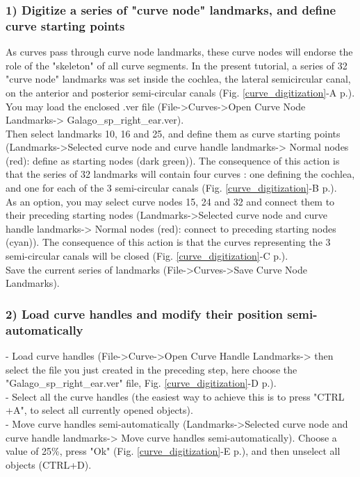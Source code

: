 \documentclass[12pt, a4paper]{book}
\begin{document}
\subsubsection{1) Digitize a series of "curve node" landmarks, and define curve starting points}
As curves pass through curve node landmarks, these curve nodes will endorse the role of the "skeleton" of all curve segments. In the present tutorial, a series of 32 "curve node" landmarks was set inside the cochlea, the lateral semicircular canal, on the anterior and posterior semi-circular canals (Fig. \ref{curve_digitization}-A p.\pageref{curve_digitization}). You may load the enclosed .ver file (File->Curves->Open Curve Node Landmarks-> Galago\_sp\_right\_ear.ver).\\

Then select landmarks 10, 16 and 25, and define them as curve starting points (Landmarks->Selected curve node and curve handle landmarks-> Normal nodes (red): define as starting nodes (dark green)). The consequence of this action is that the series of 32 landmarks will contain four
curves : one defining the cochlea, and one for each of the 3 semi-circular canals (Fig. \ref{curve_digitization}-B p.\pageref{curve_digitization}).\\

As an option, you may select curve nodes 15, 24 and 32 and connect them to their preceding starting
nodes (Landmarks->Selected curve node and curve handle landmarks-> Normal nodes (red): connect
to preceding starting nodes (cyan)). The consequence of this action is that the curves representing
the 3 semi-circular canals will be closed (Fig. \ref{curve_digitization}-C p.\pageref{curve_digitization}).\\
Save the current series of landmarks (File->Curves->Save Curve Node Landmarks).

\subsubsection{2) Load curve handles and modify their position semi-automatically}
- Load curve handles (File->Curve->Open Curve Handle Landmarks-> then select the file you just created
in the preceding step, here choose the "Galago\_sp\_right\_ear.ver" file, Fig. \ref{curve_digitization}-D p.\pageref{curve_digitization}).\\
- Select all the curve handles (the easiest way to achieve this is to press "CTRL +A", to select all currently
opened objects).\\
- Move curve handles semi-automatically (Landmarks->Selected curve node and curve handle landmarks-> Move curve handles semi-automatically). Choose a value of 25\%, press "Ok" (Fig. \ref{curve_digitization}-E p.\pageref{curve_digitization}), and then unselect all objects (CTRL+D).\\
\end{document}

